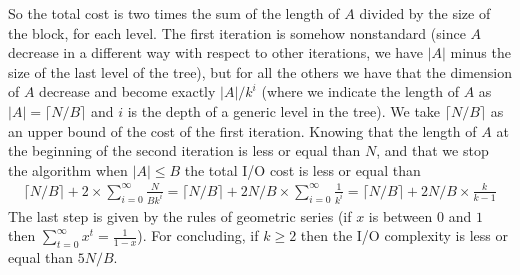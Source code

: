 \documentclass[a4paper]{article}
\newcommand\ceil[1]{\lceil#1\rceil}
\begin{document}
So the total cost is two times the sum of the length of $A$ divided by the size of the block, for each level.
The first iteration is somehow nonstandard (since $A$ decrease in a different way with respect to other iterations, we have $|A|$ minus the size of the last level of the tree), but for all the others we have that the dimension of $A$ decrease and become exactly $|A|/k^i$ (where we indicate the length of $A$ as $|A| = \ceil{N/B} $ and $i$ is the depth of a generic level in the tree).
We take $\ceil{N/B}$ as an upper bound of the cost of the first iteration.
Knowing that the length of $A$ at the beginning of the second iteration is less or equal than $N$, and that we stop the algorithm when $|A| \leq B$ the total I/O cost is less or equal than
\begin{align*}
\ceil{N/B} + 2 \times \sum_{i = 0}^{\infty} \frac{N}{Bk^i} = \ceil{N/B} + 2N/B \times \sum_{i = 0}^{\infty} \frac{1}{k^i} = \ceil{N/B} + 2N/B \times \frac{k}{k - 1}
\end{align*}
The last step is given by the rules of geometric series (if $x$ is between $0$ and $1$ then $\sum_{t = 0}^{\infty} x^t = \frac{1}{1 - x}$).
For concluding, if $k \geq 2$ then the I/O complexity is less or equal than $5N/B$.
\end{document}
